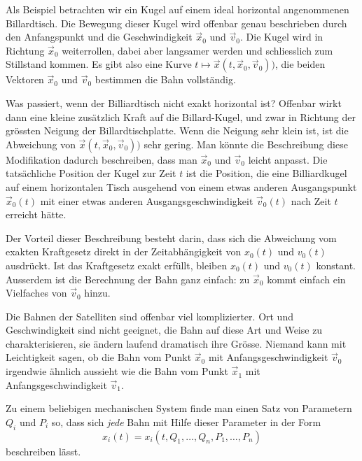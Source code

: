 \begin{beispiel}
Als Beispiel betrachten wir ein Kugel auf einem ideal horizontal angenommenen
Billardtisch. Die Bewegung dieser Kugel wird offenbar genau beschrieben
durch den Anfangspunkt und die Geschwindigkeit $\vec x_0$ und $\vec v_0$.
Die Kugel wird in Richtung $\vec x_0$ weiterrollen, dabei
aber langsamer werden und schliesslich zum Stillstand kommen.
Es gibt also eine Kurve $t\mapsto \vec x(t, \vec x_0, \vec v_0))$,
die beiden Vektoren $\vec x_0$ und $\vec v_0$ bestimmen die
Bahn vollständig.

Was passiert, wenn der Billiardtisch nicht exakt horizontal ist?
Offenbar wirkt dann eine kleine zusätzlich Kraft auf die Billard-Kugel,
und zwar in Richtung der grössten Neigung der Billardtischplatte.
Wenn die Neigung sehr klein ist, ist die Abweichung von 
$\vec x(t,\vec x_0,\vec v_0))$ sehr gering.
Man könnte die Beschreibung diese Modifikation dadurch beschreiben,
dass man $\vec x_0$ und $\vec v_0$ leicht anpasst.
Die tatsächliche Position der Kugel zur Zeit $t$ ist die Position,
die eine Billiardkugel auf einem horizontalen Tisch ausgehend von
einem etwas anderen Ausgangspunkt $\vec x_0(t)$ mit einer
etwas anderen Ausgangsgeschwindigkeit $\vec v_0(t)$
nach Zeit $t$ erreicht hätte.
\end{beispiel}

Der Vorteil dieser Beschreibung besteht darin, dass sich die
Abweichung vom exakten Kraftgesetz direkt in der Zeitabhängigkeit
von $x_0(t)$ und $v_0(t)$ ausdrückt. Ist das Kraftgesetz exakt
erfüllt, bleiben $x_0(t)$ und $v_0(t)$ konstant. Ausserdem ist die
Berechnung der Bahn ganz einfach: zu $\vec x_0$ kommt einfach
ein Vielfaches von $\vec v_0$ hinzu.

Die Bahnen der Satelliten sind offenbar viel komplizierter. 
Ort und Geschwindigkeit sind nicht geeignet, die
Bahn auf diese Art und Weise zu charakterisieren, sie ändern laufend
dramatisch ihre Grösse. Niemand kann mit Leichtigkeit sagen, ob
die Bahn vom Punkt  $\vec x_0$ mit Anfangsgeschwindigkeit $\vec v_0$
irgendwie ähnlich aussieht wie die Bahn vom Punkt $\vec x_1$
mit Anfangsgeschwindigkeit $\vec v_1$.

\begin{aufgabe}
\label{jacobi:aufgabe}
Zu einem beliebigen mechanischen System finde man einen Satz von 
Parametern 
$Q_i$ und $P_i$ so, dass sich {\em jede}
Bahn mit Hilfe dieser Parameter in der Form
\begin{equation}
x_i(t) = x_i(t,Q_1,\dots,Q_n,P_1,\dots,P_n)
\label{jacobi:aufgabekurve}
\end{equation}
beschreiben lässt.
\end{aufgabe}


